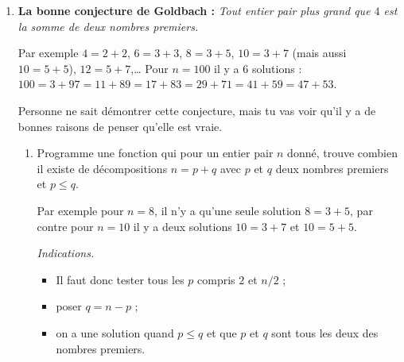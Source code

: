 \documentclass[11pt,class=report,crop=false]{standalone}
\begin{document}





\begin{activite}


\begin{enumerate}
  \item \textbf{La bonne conjecture de Goldbach :} \emph{Tout entier pair plus grand que $4$ est la somme de deux nombres premiers.}

  Par exemple $4 = 2+2$, $6=3+3$, $8=3+5$, $10=3+7$ (mais aussi $10=5+5$), $12 = 5+7$,\ldots{}
  Pour $n=100$ il y a $6$ solutions : $100=3+97=11+89=17+83=29+71=41+59=47+53$.
  
  Personne ne sait démontrer cette conjecture, mais tu vas voir qu'il y a de bonnes raisons de penser qu'elle est vraie.
  
  \begin{enumerate}
    \item Programme une fonction  qui pour un entier pair $n$ donné, trouve combien il existe de décompositions $n=p+q$ avec $p$ et $q$ deux nombres premiers et $p\le q$.
    
    Par exemple pour $n=8$, il n'y a qu'une seule solution $8=3+5$, par contre pour $n=10$ il y a deux solutions $10 =  3+7$ et $10=5+5$.
 
   \emph{Indications.} 
   \begin{itemize}
     \item Il faut donc tester tous les $p$ compris $2$ et $n/2$ ;
     \item poser $q = n - p$ ;
     \item on a une solution quand $p \le q$ et que $p$ et $q$ sont tous les deux des nombres premiers.
   \end{itemize}
   

\end{enumerate}
\end{enumerate}
\end{activite}
\end{document}
